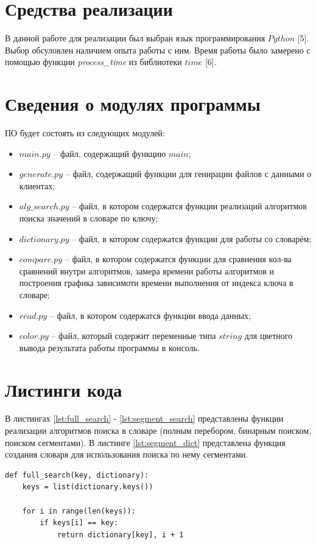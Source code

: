 \documentclass[a4paper,14pt, unknownkeysallowed]{extreport}
\begin{document}
\section{Средства реализации}

В данной работе для реализации был выбран язык программирования $Python$ [5]. Выбор обсуловлен наличием опыта работы с ним. Время работы было замерено с помощью функции \textit{process\_time} из библиотеки $time$ [6].

\section{Сведения о модулях программы}

ПО будет состоять из следующих модулей:

\begin{itemize}
	\item $main.py$ -- файл, содержащий функцию $main$;
	\item $generate.py$ -- файл, содержащий функции для генирации файлов с данными о клиентах;
    \item $alg\_search.py$ -- файл, в котором содержатся функции реализаций алгоритмов поиска значений в словаре по ключу;
    \item $dictionary.py$ -- файл, в котором содержатся функции для работы со словарём;
    \item $compare.py$ -- файл, в котором содержатся функции для сравнения кол-ва сравнений внутри алгоритмов, замера времени работы алгоритмов и построения графика зависимоти времени выполнения от индекса ключа в словаре;
    \item $read.py$ -- файл, в котором содержатся функции ввода данных;
    \item $color.py$ -- файл, который содержит переменные типа $string$ для цветного вывода результата работы программы в консоль.
\end{itemize}

\section{Листинги кода}

В листингах \ref{lst:full_search} - \ref{lst:segment_search} представлены функции реализации алгоритмов поиска в словаре (полным перебором, бинарным поиском, поиском сегментами). В листинге \ref{lst:segment_dict}
представлена функция создания словаря для использования поиска по нему сегментами.

\begin{center} 
\captionsetup{justification=raggedright,singlelinecheck=off}
\begin{lstlisting}[label=lst:full_search,caption=Алгоритм поиска полным перебором]
def full_search(key, dictionary):
    keys = list(dictionary.keys())

    for i in range(len(keys)):
        if keys[i] == key:
            return dictionary[key], i + 1
\end{lstlisting}
\end{center}	
\end{document}
